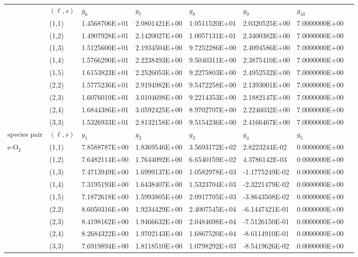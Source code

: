 \documentclass{warpdoc}
\begin{document}
\begin{table}[h]
\begin{center}
\begin{threeparttable}
\begin{tabular*}{\textwidth}{@{\extracolsep{\fill}}llllllll}
 & $(\ell,s)$ & $g_6$ & $g_7$ & $g_8$ & $g_9$ & $g_{10}$ \\
\cmidrule(lr{1em}){2-7}	
&	(1,1)	&	1.4568706E+01	&	2.0801421E+00	&	1.0511520E+01	&	2.0320525E+00	&	7.0000000E+00	\\
&	(1,2)	&	1.4907928E+01	&	2.1420027E+00	&	1.0057131E+01	&	2.3400382E+00	&	7.0000000E+00	\\
&	(1,3)	&	1.5125600E+01	&	2.1934504E+00	&	9.7252286E+00	&	2.4094586E+00	&	7.0000000E+00	\\
&	(1,4)	&	1.5766290E+01	&	2.2238493E+00	&	9.5040311E+00	&	2.3875410E+00	&	7.0000000E+00	\\
&	(1,5)	&	1.6153823E+01	&	2.2526053E+00	&	9.2275803E+00	&	2.4952532E+00	&	7.0000000E+00	\\
&	(2,2)	&	1.5775236E+01	&	2.9194982E+00	&	9.5472258E+00	&	2.1393001E+00	&	7.0000000E+00	\\
&	(2,3)	&	1.6076010E+01	&	3.0104698E+00	&	9.2214353E+00	&	2.1882147E+00	&	7.0000000E+00	\\
&	(2,4)	&	1.6844386E+01	&	3.0592425E+00	&	8.9702707E+00	&	2.2246032E+00	&	7.0000000E+00	\\
&	(3,3)	&	1.5326933E+01	&	2.8132158E+00	&	9.5154236E+00	&	2.4166467E+00	&	7.0000000E+00	\\
      \midrule
species pair & $(\ell,s)$ & $g_1$ & $g_2$ & $g_3$ & $g_4$ & $g_5$ \\
\midrule
\multirow{19}{*}{e-$\mathrm{O_2}$} &	(1,1)	&	7.8588787E+00	&	1.8369546E+00	&	3.5693172E+02	&	2.8223244E-02	&	0.0000000E+00	\\
&	(1,2)	&	7.6482114E+00	&	1.7644092E+00	&	6.6540159E+02	&	4.3786142E-03	&	0.0000000E+00	\\
&	(1,3)	&	7.4713949E+00	&	1.6999137E+00	&	1.0582978E+03	&	-1.1775249E-02	&	0.0000000E+00	\\
&	(1,4)	&	7.3195193E+00	&	1.6438407E+00	&	1.5323704E+03	&	-2.3221479E-02	&	0.0000000E+00	\\
&	(1,5)	&	7.1872618E+00	&	1.5993805E+00	&	2.0917705E+03	&	-3.8643508E-02	&	0.0000000E+00	\\
&	(2,2)	&	8.6050316E+00	&	1.9234429E+00	&	2.4007545E+04	&	-6.1447421E-01	&	0.0000000E+00	\\
&	(2,3)	&	8.4198162E+00	&	1.9466632E+00	&	2.0484698E+04	&	-7.5126150E-01	&	0.0000000E+00	\\
&	(2,4)	&	8.2684322E+00	&	1.9702143E+00	&	1.6867520E+04	&	-8.6114910E-01	&	0.0000000E+00	\\
&	(3,3)	&	7.6919894E+00	&	1.8118510E+00	&	1.0798292E+03	&	-8.5419626E-02	&	0.0000000E+00	\\

\end{tabular*}
\end{threeparttable}
\end{center}
\end{table}
\end{document}
